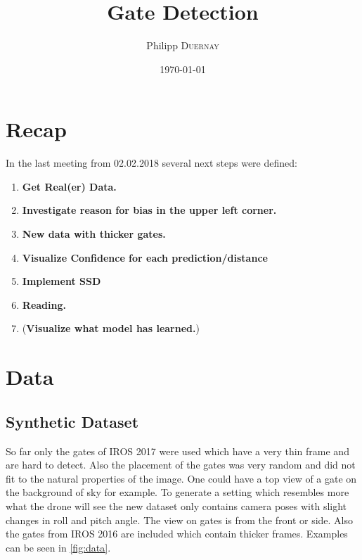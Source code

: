 \documentclass{article}
\title{Gate Detection} %
\author{Philipp \textsc{Duernay}} %
\date{\today} %
\begin{document}
\maketitle


\section{Recap}
In the last meeting from 02.02.2018 several next steps were defined:
\begin{enumerate}
	\item \textbf{Get Real(er) Data.}
	\item \textbf{Investigate reason for bias in the upper left corner.}
	\item \textbf{New data with thicker gates.}
	\item \textbf{Visualize Confidence for each prediction/distance}
	\item \textbf{Implement SSD}
	\item \textbf{Reading.}
	\item (\textbf{Visualize what model has learned.})
\end{enumerate}

\section{Data}

\subsection{Synthetic Dataset}
So far only the gates of IROS 2017 were used which have a very thin frame and are hard to detect. Also the placement of the gates was very random and did not fit to the natural properties of the image. One could have a top view of a gate on the background of sky for example. To generate a setting which resembles more what the drone will see the new dataset only contains camera poses with slight changes in roll and pitch angle. The view on gates is from the front or side. Also the gates from IROS 2016 are included which contain thicker frames. Examples can be seen in \autoref{fig:data}.
\end{document}
